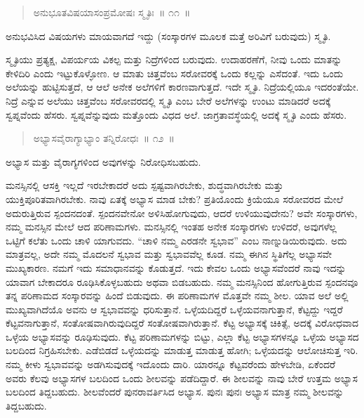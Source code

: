 \vspace{-0.2cm}

\begin{verse}
ಅನುಭೂತವಿಷಯಾಸಂಪ್ರಮೋಷಃ ಸ್ಮೃತಿಃ~॥ ೧೧~॥
\end{verse}

\vspace{-0.1cm}

ಅನುಭವಿಸಿದ ವಿಷಯಗಳು ಮಾಯವಾಗದೆ ಇದ್ದು (ಸಂಸ್ಕಾರಗಳ ಮೂಲಕ ಮತ್ತೆ ಅರಿವಿಗೆ ಬರುವುದು) ಸ್ಮೃತಿ. 

ಸ್ಮೃತಿಯು ಪ್ರತ್ಯಕ್ಷ, ವಿಪರ್ಯಯ ವಿಕಲ್ಪ ಮತ್ತು ನಿದ್ರೆಗಳಿಂದ ಬರುವುದು. ಉದಾಹರಣೆಗೆ, ನೀವು ಒಂದು ಮಾತನ್ನು ಕೇಳಿದಿರಿ ಎಂದು ಇಟ್ಟುಕೊಳ್ಳೋಣ. ಆ ಮಾತು ಚಿತ್ತವೆಂಬ ಸರೋವರಕ್ಕೆ ಒಂದು ಕಲ್ಲನ್ನು ಎಸೆದಂತೆ. ಇದು ಒಂದು ಅಲೆಯನ್ನು ಹುಟ್ಟಿಸುತ್ತದೆ, ಆ ಆಲೆ ಅನೇಕ ಅಲೆಗಳಿಗೆ ಕಾರಣವಾಗುತ್ತದೆ. ಇದೇ ಸ್ಮೃತಿ. ನಿದ್ರೆಯಲ್ಲಿಯೂ ಇದರಂತೆಯೇ. ನಿದ್ರೆ ಎನ್ನುವ ಅಲೆಯು ಚಿತ್ತವೆಂಬ ಸರೋವರದಲ್ಲಿ ಸ್ಮೃತಿ ಎಂಬ ಬೇರೆ ಅಲೆಗಳನ್ನು ಉಂಟು ಮಾಡಿದರೆ ಅದಕ್ಕೆ ಸ್ವಪ್ನವೆಂದು ಹೆಸರು. ಸ್ವಪ್ನವೆನ್ನುವುದು ಮತ್ತೊಂದು ವಿಧದ ಅಲೆ. ಜಾಗ್ರತಾವಸ್ಥೆಯಲ್ಲಿ ಅದಕ್ಕೆ ಸ್ಮೃತಿ ಎಂದು ಹೆಸರು. 

\vspace{-0.2cm}

\begin{verse}
ಅಭ್ಯಾಸವೈರಾಗ್ಯಾಭ್ಯಾಂ ತನ್ನಿರೋಧಃ~॥ ೧೨~॥
\end{verse}

\vspace{-0.1cm}

ಅಭ್ಯಾಸ ಮತ್ತು ವೈರಾಗ್ಯಗಳಿಂದ ಅವುಗಳನ್ನು ನಿರೋಧಿಸಬಹುದು. 

ಮನಸ್ಸಿನಲ್ಲಿ ಆಸಕ್ತಿ ಇಲ್ಲದೆ ಇರಬೇಕಾದರೆ ಅದು ಸ್ಪಷ್ಟವಾಗಿರಬೇಕು, ಶುದ್ಧವಾಗಿರಬೇಕು ಮತ್ತು ಯುಕ್ತಿಪೂರಿತವಾಗಿರಬೇಕು. ನಾವು ಏತಕ್ಕೆ ಅಭ್ಯಾಸ ಮಾಡ ಬೇಕು? ಪ್ರತಿಯೊಂದು ಕ್ರಿಯೆಯೂ ಸರೋವರದ ಮೇಲೆ ಅದುರುತ್ತಿರುವ ಸ್ಪಂದನದಂತೆ. ಸ್ಪಂದನವೇನೋ ಅಳಿಸಿಹೋಗುವುದು, ಆದರೆ ಉಳಿಯುವುದೇನು? ಅವೇ ಸಂಸ್ಕಾರಗಳು, ನಮ್ಮ ಮನಸ್ಸಿನ ಮೇಲೆ ಆದ ಪರಿಣಾಮಗಳು. ಮನಸ್ಸಿನಲ್ಲಿ ಇಂತಹ ಅನೇಕ ಸಂಸ್ಕಾರಗಳು ಉಳಿದರೆ, ಅವುಗಳೆಲ್ಲ ಒಟ್ಟಿಗೆ ಕಲೆತು ಒಂದು ಚಾಳಿ ಯಾಗುವದು. “ಚಾಳಿ ನಮ್ಮ ಎರಡನೇ ಸ್ವಭಾವ” ಎಂಬ ನಾಣ್ನುಡಿಯಿರುವುದು. ಅದು ಮಾತ್ರವಲ್ಲ, ಅದೇ ನಮ್ಮ ಮೊದಲನೆ ಸ್ವಭಾವ ಮತ್ತು ಸ್ವಭಾವವೆಲ್ಲ ಕೂಡ. ನಮ್ಮ ಈಗಿನ ಸ್ಥಿತಿಗೆಲ್ಲ ಅಭ್ಯಾಸವೇ ಮುಖ್ಯಕಾರಣ. ನಮಗೆ ಇದು ಸಮಾಧಾನವನ್ನು ಕೊಡುತ್ತದೆ. ಇದು ಕೇವಲ ಒಂದು ಅಭ್ಯಾಸವೆಂದರೆ ನಾವು ಇದನ್ನು ಯಾವಾಗ ಬೇಕಾದರೂ ರೂಢಿಸಿಕೊಳ್ಳಬಹುದು ಅಥವಾ ಬಿಡಬಹುದು. ನಮ್ಮ ಮನಸ್ಸಿನಿಂದ ಹೋಗುತ್ತಿರುವ ಸ್ಪಂದನವೂ ತನ್ನ ಪರಿಣಾಮದ ಸಂಸ್ಕಾರವನ್ನು ಹಿಂದೆ ಬಿಡುವುದು. ಈ ಪರಿಣಾಮಗಳ ಮೊತ್ತವೇ ನಮ್ಮ ಶೀಲ. ಯಾವ ಅಲೆ ಅಲ್ಲಿ ಮುಖ್ಯವಾಗಿದೆಯೊ ಅವನು ಆ ಸ್ವಭಾವವನ್ನು ಧರಿಸುತ್ತಾನೆ. ಒಳ್ಳೆಯದಿದ್ದರೆ ಒಳ್ಳೆಯವನಾಗುತ್ತಾನೆ, ಕೆಟ್ಟದ್ದು ಇದ್ದರೆ ಕೆಟ್ಟವನಾಗುತ್ತಾನೆ, ಸಂತೋಷವಾಗಿರುವುದಿದ್ದರೆ ಸಂತೋಷವಾಗಿರುತ್ತಾನೆ. ಕೆಟ್ಟ ಅಭ್ಯಾಸಕ್ಕೆ ಚಿಕಿತ್ಸೆ, ಅದಕ್ಕೆ ವಿರೋಧವಾದ ಒಳ್ಳೆಯ ಅಭ್ಯಾಸವನ್ನು ರೂಢಿಸುವುದು. ಕೆಟ್ಟ ಪರಿಣಾಮಗಳನ್ನು ಬಿಟ್ಟು, ಎಲ್ಲಾ ಕೆಟ್ಟ ಅಭ್ಯಾಸಗಳನ್ನೂ ಒಳ್ಳೆಯ ಅಭ್ಯಾಸದ ಬಲದಿಂದ ನಿಗ್ರಹಿಸಬೇಕು. ಎಡೆಬಿಡದೆ ಒಳ್ಳೆಯದನ್ನು ಮಾಡುತ್ತ ಮಾಡುತ್ತ ಹೋಗಿ; ಒಳ್ಳೆಯದನ್ನು ಆಲೋಚಿಸುತ್ತ ಇರಿ. ನಮ್ಮ ಕೀಳು ಸ್ವಭಾವವನ್ನು ಅಡಗಿಸುವುದಕ್ಕೆ ಇದೊಂದು ದಾರಿ. ಯಾರನ್ನೂ ಕೆಟ್ಟವರೆಂದು ಹೇಳಬೇಡಿ, ಏಕೆಂದರೆ ಅವರು ಕೆಲವು ಅಭ್ಯಾಸಗಳ ಬಲದಿಂದ ಒಂದು ಶೀಲವನ್ನು ಪಡೆದಿದ್ದಾರೆ. ಈ ಶೀಲವನ್ನು ನಾವು ಬೇರೆ ಉತ್ತಮ ಅಭ್ಯಾಸ ಬಲದಿಂದ ತಿದ್ದಬಹುದು. ಶೀಲವೆಂದರೆ ಪುನರಾವರ್ತಿಸಿದ ಅಭ್ಯಾಸ. ಪುನಃ ಪುನಃ ಅಭ್ಯಾಸ ಮಾತ್ರ ನಮ್ಮ ಶೀಲವನ್ನು ತಿದ್ದಬಹುದು. 


